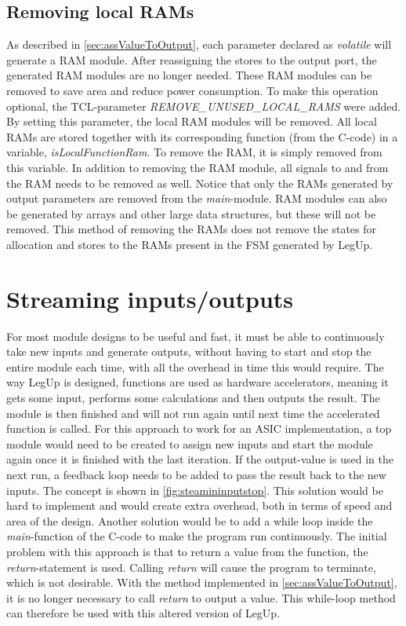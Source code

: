 \subsection{\label{subsec:removerams}Removing local RAMs}
As described in \cref{sec:assValueToOutput}, each parameter declared as \textit{volatile} will generate a RAM module. After reassigning the stores to the output port, the generated RAM modules are no longer needed. These RAM modules can be removed to save area and reduce power consumption. To make this operation optional, the TCL-parameter \textit{REMOVE\_UNUSED\_LOCAL\_RAMS} were added. By setting this parameter, the local RAM modules will be removed. All local RAMs are stored together with its corresponding function (from the C-code) in a variable, \textit{isLocalFunctionRam}. To remove the RAM, it is simply removed from this variable. In addition to removing the RAM module, all signals to and from the RAM needs to be removed as well. Notice that only the RAMs generated by output parameters are removed from the \textit{main}-module. RAM modules can also be generated by arrays and other large data structures, but these will not be removed. This method of removing the RAMs does not remove the states for allocation and stores to the RAMs present in the FSM generated by LegUp. 

\section{\label{sec:streamingio}Streaming inputs/outputs}
For most module designs to be useful and fast, it must be able to continuously take new inputs and generate outputs, without having to start and stop the entire module each time, with all the overhead in time this would require. The way LegUp is designed, functions are used as hardware accelerators, meaning it gets some input, performs some calculations and then outputs the result. The module is then finished and will not run again until next time the accelerated function is called. For this approach to work for an ASIC implementation, a top module would need to be created to assign new inputs and start the module again once it is finished with the last iteration. If the output-value is used in the next run, a feedback loop needs to be added to pass the result back to the new inputs. The concept is shown in \cref{fig:steamininputstop}. This solution would be hard to implement and would create extra overhead, both in terms of speed and area of the design. Another solution would be to add a while loop inside the \textit{main}-function of the C-code to make the program run continuously. The initial problem with this approach is that to return a value from the function, the \textit{return}-statement is used. Calling \textit{return} will cause the program to terminate, which is not desirable. With the method implemented in \cref{sec:assValueToOutput}, it is no longer necessary to call \textit{return} to output a value. This while-loop method can therefore be used with this altered version of LegUp.

